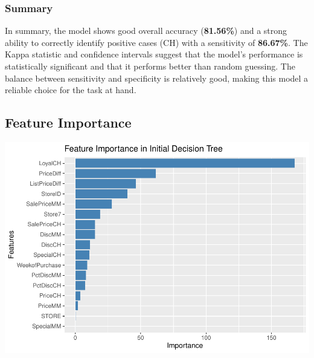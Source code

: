 \documentclass[
]{article}
\newenvironment{Shaded}{\begin{snugshade}}{\end{snugshade}}
\newcommand{\AttributeTok}[1]{\textcolor[rgb]{0.13,0.29,0.53}{#1}}
\newcommand{\ConstantTok}[1]{\textcolor[rgb]{0.56,0.35,0.01}{#1}}
\newcommand{\FunctionTok}[1]{\textcolor[rgb]{0.13,0.29,0.53}{\textbf{#1}}}
\newcommand{\NormalTok}[1]{#1}
\newcommand{\OtherTok}[1]{\textcolor[rgb]{0.56,0.35,0.01}{#1}}
\newcommand{\SpecialCharTok}[1]{\textcolor[rgb]{0.81,0.36,0.00}{\textbf{#1}}}
\newcommand{\StringTok}[1]{\textcolor[rgb]{0.31,0.60,0.02}{#1}}
\begin{document}
\hypertarget{summary}{%
\subsubsection{Summary}\label{summary}}

In summary, the model shows good overall accuracy (\textbf{81.56\%}) and
a strong ability to correctly identify positive cases (CH) with a
sensitivity of \textbf{86.67\%}. The Kappa statistic and confidence
intervals suggest that the model's performance is statistically
significant and that it performs better than random guessing. The
balance between sensitivity and specificity is relatively good, making
this model a reliable choice for the task at hand.

\hypertarget{feature-importance}{%
\subsection{Feature Importance}\label{feature-importance}}

\begin{Shaded}
\end{Shaded}

\includegraphics{OJ_files/figure-latex/unnamed-chunk-9-1.pdf}
\end{document}
